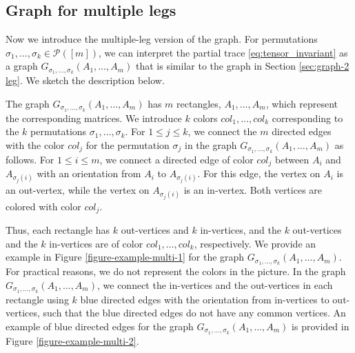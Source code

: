 \documentclass[12pt]{article}
\numberwithin{equation}{section}
\theoremstyle{plain}
\def\cP{\mathcal P}
\begin{document}
\subsection{Graph for multiple legs} \label{sec:graph-multi leg}

Now we introduce the multiple-leg version of the graph.
For permutations $\sigma_1,\ldots,\sigma_k \in \cP([m])$, we can interpret the partial trace \eqref{eq:tensor_invariant} as a graph $G_{\sigma_1,\ldots,\sigma_k} (A_1,\ldots,A_m)$ that is similar to the graph in Section \ref{sec:graph-2 leg}. We sketch the description below.

The graph $G_{\sigma_1,\ldots,\sigma_k} (A_1,\ldots,A_m)$ has $m$ rectangles, $A_1,\ldots,A_m$, which represent the corresponding matrices.
We introduce $k$ colors $col_1, \ldots, col_k$ corresponding to the $k$ permutations $\sigma_1,\ldots,\sigma_k$.
For $1 \le j \le k$, we connect the $m$ directed edges with the color $col_j$ for the permutation $\sigma_j$ in the graph $G_{\sigma_1,\ldots,\sigma_k} (A_1,\ldots,A_m)$ as follows.
For $1 \le i \le m$, we connect a directed edge of color $col_j$ between $A_i$ and $A_{\sigma_j(i)}$ with an orientation from $A_i$ to $A_{\sigma_j(i)}$. For this edge, the vertex on $A_i$ is an out-vertex, while the vertex on $A_{\sigma_j(i)}$ is an in-vertex. Both vertices are colored with color $col_j$.

Thus, each rectangle has $k$ out-vertices and $k$ in-vertices, and the $k$ out-vertices and the $k$ in-vertices are of color $col_1,\ldots,col_k$, respectively. We provide an example in Figure \ref{figure-example-multi-1} for the graph $G_{\sigma_1,\ldots,\sigma_k} (A_1,\ldots,A_m)$.
For practical reasons, we do not represent the colors in the picture.
In the graph $G_{\sigma_1,\ldots,\sigma_k} (A_1,\ldots,A_m)$, we connect the in-vertices and the out-vertices in each rectangle using $k$ blue directed edges with the orientation from in-vertices to out-vertices, such that the blue directed edges do not have any common vertices. An example of blue directed edges for the graph $G_{\sigma_1,\ldots,\sigma_k} (A_1,\ldots,A_m)$ is provided in Figure \ref{figure-example-multi-2}.
\end{document}
